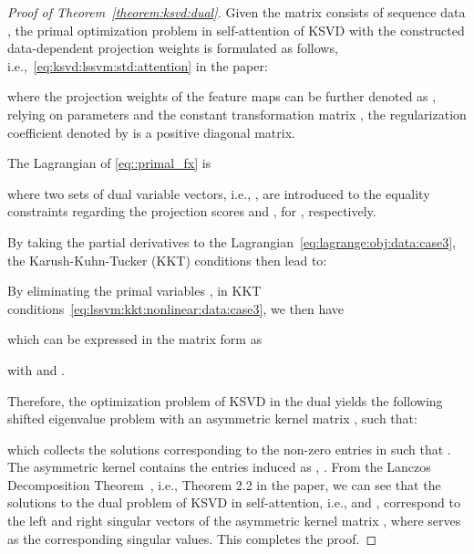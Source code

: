 \documentclass{article}
\begin{document}
\begin{proof}[Proof of Theorem~\ref{theorem:ksvd:dual}]
Given the matrix  consists of sequence data , the primal optimization problem in self-attention of KSVD with the constructed data-dependent projection weights  is formulated as follows, i.e.,~\eqref{eq:ksvd:lssvm:std:attention} in the paper:

where the projection weights of the feature maps  can be further denoted as ,  relying on parameters
 and the constant transformation matrix , the regularization coefficient denoted by  is a positive diagonal matrix.

The Lagrangian of \eqref{eq::primal_fx} is

where two sets of dual variable vectors, i.e., , are introduced to the equality constraints regarding the projection scores  and , for , respectively.

By taking the partial derivatives to the Lagrangian~\eqref{eq:lagrange:obj:data:case3}, the Karush-Kuhn-Tucker (KKT) conditions then lead to:


By eliminating the primal variables ,  in KKT conditions~\eqref{eq:lssvm:kkt:nonlinear:data:case3}, we then have

which can be expressed in the matrix form as

with  and . 

Therefore, the optimization problem of KSVD in the dual yields the following shifted eigenvalue problem with an asymmetric kernel matrix , such that:

which collects the solutions corresponding to the non-zero entries in  such that 
. 
The asymmetric kernel  contains the entries induced as
, . 
From the Lanczos Decomposition Theorem~\cite{lanczos1958linear}, i.e., Theorem 2.2 in the paper, we can see that the solutions to the dual problem of KSVD in self-attention, i.e.,  and , correspond to the left and right singular vectors of the asymmetric kernel matrix , 
where  serves as  the corresponding  singular values. 
This completes the proof.

\end{proof}
\end{document}
